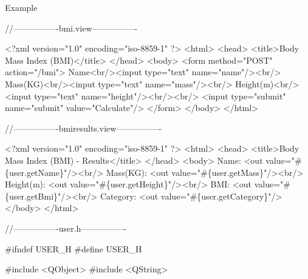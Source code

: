\begin{DoxyParagraph}{Example}

\begin{DoxyCode}
\textcolor{comment}{//----------------bmi.view----------------}

<?xml version=\textcolor{stringliteral}{"1.0"} encoding=\textcolor{stringliteral}{"iso-8859-1"} ?>
<html>
     <head>
         <title>Body Mass Index (BMI)</title>
     </head>
     <body>
         <form method=\textcolor{stringliteral}{"POST"} action=\textcolor{stringliteral}{"/bmi"}>
             Name<br/><input type=\textcolor{stringliteral}{"text"} name=\textcolor{stringliteral}{"name"}/><br/>
             Mass(KG)<br/><input type=\textcolor{stringliteral}{"text"} name=\textcolor{stringliteral}{"mass"}/><br/>
             Height(m)<br/><input type=\textcolor{stringliteral}{"text"} name=\textcolor{stringliteral}{"height"}/><br/><br/>
             <input type=\textcolor{stringliteral}{"submit"} name=\textcolor{stringliteral}{"submit"} value=\textcolor{stringliteral}{"Calculate"}/>
         </form>
     </body>
 </html>

\textcolor{comment}{//----------------bmiresults.view----------------}

<?xml version=\textcolor{stringliteral}{"1.0"} encoding=\textcolor{stringliteral}{"iso-8859-1"} ?>
<html>
     <head>
         <title>Body Mass Index (BMI) - Results</title>
     </head>
     <body>
         Name: <out value=\textcolor{stringliteral}{"#\{user.getName\}"}/><br/>
         Mass(KG): <out value=\textcolor{stringliteral}{"#\{user.getMass\}"}/><br/>
         Height(m): <out value=\textcolor{stringliteral}{"#\{user.getHeight\}"}/><br/>
         BMI: <out value=\textcolor{stringliteral}{"#\{user.getBmi\}"}/><br/>
         Category: <out value=\textcolor{stringliteral}{"#\{user.getCategory\}"}/>
     </body>
</html>

\textcolor{comment}{//----------------user.h----------------}

#ifndef USER\_H
#define USER\_H

#include <QObject>
#include <QString>


\end{DoxyCode}
\end{DoxyParagraph}
